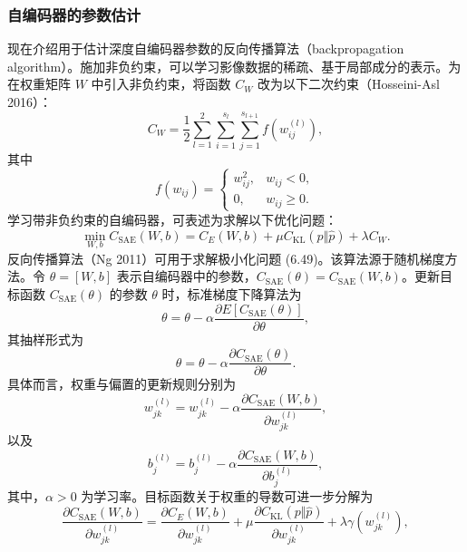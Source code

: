 \subsubsection{自编码器的参数估计}

现在介绍用于估计深度自编码器参数的反向传播算法（backpropagation algorithm）。施加非负约束，可以学习影像数据的稀疏、基于局部成分的表示。为在权重矩阵 $W$ 中引入非负约束，将函数 $C_W$ 改为以下二次约束（Hosseini-Asl 2016）：
\begin{equation}
C_W=\frac12\sum_{l=1}^2\sum_{i=1}^{s_l}\sum_{j=1}^{s_{l+1}}f(w_{ij}^{(l)}),
\tag{6.48}
\end{equation}
其中
\[
f(w_{ij})=\begin{cases}w_{ij}^2,&w_{ij}<0,\\0,&w_{ij}\geq0.\end{cases}
\]
学习带非负约束的自编码器，可表述为求解以下优化问题：
\begin{equation}
\min_{W,b}C_{\mathrm{SAE}}(W,b)=C_E(W,b)+\mu C_{\mathrm{KL}}(p\Vert\widehat p)+\lambda C_W.
\tag{6.49}
\end{equation}
反向传播算法（Ng 2011）可用于求解极小化问题 (6.49)。该算法源于随机梯度方法。令 $\theta=[W,b]$ 表示自编码器中的参数，$C_{\mathrm{SAE}}(\theta)=C_{\mathrm{SAE}}(W,b)$。更新目标函数 $C_{\mathrm{SAE}}(\theta)$ 的参数 $\theta$ 时，标准梯度下降算法为
\begin{equation}
\theta=\theta-\alpha\frac{\partial E[C_{\mathrm{SAE}}(\theta)]}{\partial\theta},
\tag{6.50}
\end{equation}
其抽样形式为
\begin{equation}
\theta=\theta-\alpha\frac{\partial C_{\mathrm{SAE}}(\theta)}{\partial\theta}.
\tag{6.51}
\end{equation}
具体而言，权重与偏置的更新规则分别为
\begin{equation}
w_{jk}^{(l)}=w_{jk}^{(l)}-\alpha\frac{\partial C_{\mathrm{SAE}}(W,b)}{\partial w_{jk}^{(l)}},
\tag{6.52}
\end{equation}
以及
\begin{equation}
b_j^{(l)}=b_j^{(l)}-\alpha\frac{\partial C_{\mathrm{SAE}}(W,b)}{\partial b_j^{(l)}},
\tag{6.53}
\end{equation}
其中，$\alpha>0$ 为学习率。目标函数关于权重的导数可进一步分解为
\begin{equation}
\frac{\partial C_{\mathrm{SAE}}(W,b)}{\partial w_{jk}^{(l)}}=
\frac{\partial C_E(W,b)}{\partial w_{jk}^{(l)}}+\mu\frac{\partial C_{\mathrm{KL}}(p\Vert\widehat p)}{\partial w_{jk}^{(l)}}+\lambda\gamma(w_{jk}^{(l)}),
\tag{6.54}
\end{equation}

